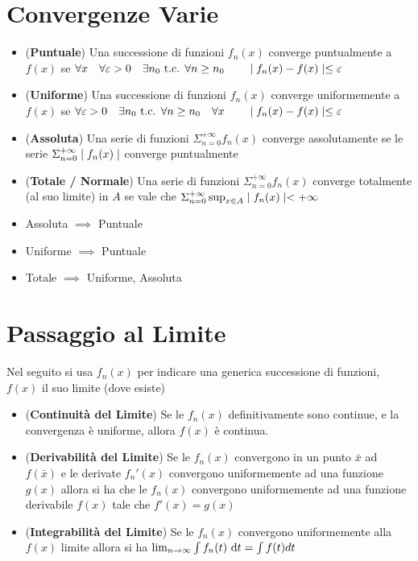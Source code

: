 \documentclass[a4paper,NoNotes,GeneralMath]{stdmdoc}
\begin{document}
\section*{Convergenze Varie}
	\begin{itemize}
		\item ({\bf Puntuale}) Una successione di funzioni $f_n(x)$ converge puntualmente a $f(x)$ se $\forall x \quad \forall \varepsilon > 0 \quad \exists n_0 \mbox{ t.c. } \forall n \ge n_0 \qquad \mid f_n(x) - f(x) \mid \le \varepsilon$
		\item ({\bf Uniforme}) Una successione di funzioni $f_n(x)$ converge uniformemente a $f(x)$ se $\forall \varepsilon > 0 \quad \exists n_0 \mbox{ t.c. } \forall n \ge n_0 \quad \forall x \qquad \mid f_n(x) - f(x) \mid \le \varepsilon$
		\item ({\bf Assoluta}) Una serie di funzioni $\Sigma_{n=0}^{+\infty} f_n(x)$ converge assolutamente se le serie $\Sigma_{n=0}^{+\infty} \mid f_n(x) \mid$ converge puntualmente
		\item ({\bf Totale / Normale}) Una serie di funzioni $\Sigma_{n=0}^{+\infty} f_n(x)$ converge totalmente (al suo limite) in $A$ se vale che $\Sigma_{n=0}^{+\infty} \sup_{x\in A} \mid f_n(x) \mid < +\infty$
		\item Assoluta $\implies$ Puntuale
		\item Uniforme $\implies$ Puntuale
		\item Totale $\implies$ Uniforme, Assoluta
	\end{itemize}

	\section*{Passaggio al Limite}
	Nel seguito si usa $f_n(x)$ per indicare una generica successione di funzioni, $f(x)$ il suo limite (dove esiste)
	\begin{itemize}
		\item ({\bf Continuità del Limite}) Se le $f_n(x)$ definitivamente sono continue, e la convergenza è uniforme, allora $f(x)$ è continua.
		\item ({\bf Derivabilità del Limite}) Se le $f_n(x)$ convergono in un punto $\bar{x}$ ad $f(\bar{x})$ e le derivate $f_n'(x)$ convergono uniformemente ad una funzione $g(x)$ allora si ha che le $f_n(x)$ convergono uniformemente ad una funzione derivabile $f(x)$ tale che $f'(x) = g(x)$
		\item ({\bf Integrabilità del Limite}) Se le $f_n(x)$ convergono uniformemente alla $f(x)$ limite allora si ha $\lim_{n \rightarrow \infty} \int f_n(t) \de t = \int f(t) dt$
	\end{itemize}
\end{document}
